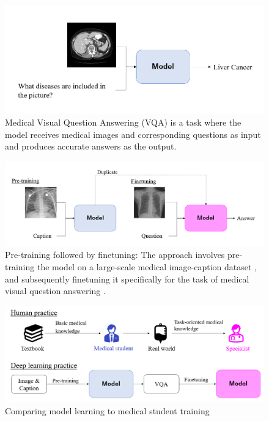 \begin{figure}[t]
\begin{center}
\includegraphics[width=1.0\linewidth]{Chapter_1/chap1_medvqa.png}
\end{center}
   \caption{Medical Visual Question Answering (VQA) \cite{liu2021slake} is a task where the model receives medical images and corresponding questions as input and produces accurate answers as the output.
}
\label{fig:medvqa}
\end{figure}

\begin{figure}[t]
\begin{center}
\includegraphics[width=1.0\linewidth]{Chapter_1/chap1_pretrain_finetune.png}
\end{center}
   \caption{Pre-training followed by finetuning: The approach involves pre-training the model on a large-scale medical image-caption dataset \cite{Pelka2018RadiologyOI}, and subsequently finetuning it specifically for the task of medical visual question answering \cite{liu2021slake}.
}
\label{fig:pretrainFinetune}
\end{figure}

\begin{figure}[t]
\begin{center}
\includegraphics[width=1.0\linewidth]{Chapter_1/chap1_medstudent.png}
\end{center}
   \caption{Comparing model learning to medical student training
}
\label{fig:medstudent}
\end{figure}


